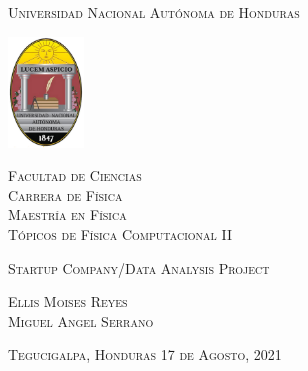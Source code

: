 \documentclass[12pt,a4paper,openright]{article}
\begin{document}

\begin{center}
\vspace{-0.5cm}
{\Large\textsc{Universidad Nacional Autónoma de Honduras}}
\vspace{0.5cm}

\begin{center}
  \includegraphics[width=2cm]{unah}
\end{center}
\vspace{1cm}

{\large
\textsc{Facultad de Ciencias}\\
\textsc{Carrera de Física}\\
\vspace{0.45cm}
\textsc{Maestría en Física}\\
\vspace{0.75cm}
\textsc{T\'opicos de F\'isica Computacional II}\\
}

\normalsize\textsc{Startup Company/Data Analysis Project }
\vspace{1.15cm}

{\large\textsc{Ellis Moises Reyes\\Miguel Angel Serrano}}
\vspace{5cm}




{\large\textsc{Tegucigalpa, Honduras 17 de Agosto, 2021}}

\end{center}


\newpage

\end{document}
